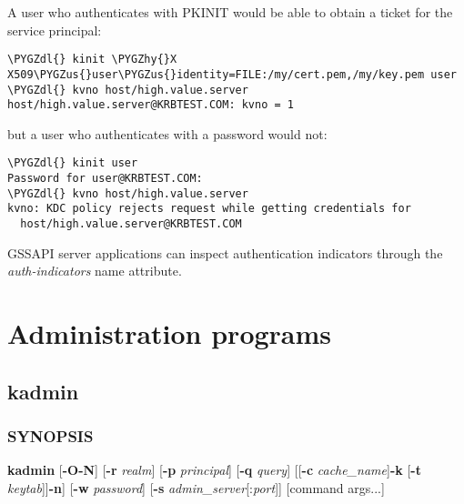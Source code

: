 \documentclass[letterpaper,10pt,english]{sphinxmanual}
\def\PYGZus{\char`\_}
\def\PYGZdl{\char`\$}
\def\PYGZhy{\char`\-}
\begin{document}
A user who authenticates with PKINIT would be able to obtain a ticket
for the service principal:

\begin{Verbatim}[commandchars=\\\{\}]
\PYGZdl{} kinit \PYGZhy{}X X509\PYGZus{}user\PYGZus{}identity=FILE:/my/cert.pem,/my/key.pem user
\PYGZdl{} kvno host/high.value.server
host/high.value.server@KRBTEST.COM: kvno = 1
\end{Verbatim}

but a user who authenticates with a password would not:

\begin{Verbatim}[commandchars=\\\{\}]
\PYGZdl{} kinit user
Password for user@KRBTEST.COM:
\PYGZdl{} kvno host/high.value.server
kvno: KDC policy rejects request while getting credentials for
  host/high.value.server@KRBTEST.COM
\end{Verbatim}

GSSAPI server applications can inspect authentication indicators
through the \emph{auth-indicators} name
attribute.


\chapter{Administration  programs}
\label{admin/admin_commands/index:administration-programs}\label{admin/admin_commands/index::doc}

\section{kadmin}
\label{admin/admin_commands/kadmin_local::doc}\label{admin/admin_commands/kadmin_local:kadmin}\label{admin/admin_commands/kadmin_local:kadmin-1}

\subsection{SYNOPSIS}
\label{admin/admin_commands/kadmin_local:synopsis}\label{admin/admin_commands/kadmin_local:kadmin-synopsis}
\textbf{kadmin}
{[}\textbf{-O}\textbar{}\textbf{-N}{]}
{[}\textbf{-r} \emph{realm}{]}
{[}\textbf{-p} \emph{principal}{]}
{[}\textbf{-q} \emph{query}{]}
{[}{[}\textbf{-c} \emph{cache\_name}{]}\textbar{}{[}\textbf{-k} {[}\textbf{-t} \emph{keytab}{]}{]}\textbar{}\textbf{-n}{]}
{[}\textbf{-w} \emph{password}{]}
{[}\textbf{-s} \emph{admin\_server}{[}:\emph{port}{]}{]}
{[}command args...{]}
\end{document}
